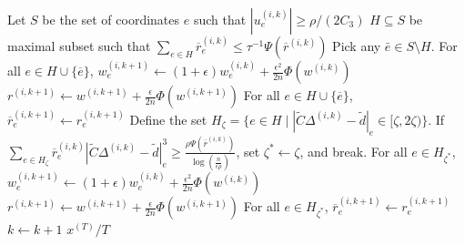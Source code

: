 \documentclass[11pt]{article}
\newcommand\dd{\boldsymbol{\mathit{d}}}
\newcommand\rr{\boldsymbol{\mathit{r}}}
\newcommand\uu{\boldsymbol{\mathit{u}}}
\newcommand\ww{\boldsymbol{\mathit{w}}}
\newcommand\xx{\boldsymbol{\mathit{x}}}
\newcommand\rrbar{\overline{\boldsymbol{\mathit{r}}}}
\newcommand\CC{\boldsymbol{\mathit{C}}}
\newcommand{\wt}{\widetilde}
\newcommand{\ov}{\overline}
\begin{document}
\begin{algorithm}
\begin{algorithmic}[1]
\State Let $S$ be the set of coordinates $e$ such that $|\uu^{(i,k)}_e|\geq \rho/(2C_3)$ \label{algline:setSRobust}
\State $H \subseteq S$ be maximal subset such that $\sum_{e\in H}\rrbar_e^{(i,k)}\leq \tau^{-1}\Psi(\rrbar^{(i,k)}) $
\State Pick any $\bar{e}\in S\setminus H$.
\State For all $e\in H \cup \{\ov{e}\} $, $\ww_e^{(i,k+1)}\gets (1+\epsilon)\ww_e^{(i,k)} + \frac{\epsilon^2}{2n}\Phi(\ww^{(i,k)})$ 
\State $\rr^{(i,k+1)}\gets \ww^{(i,k+1)} + \frac{\epsilon}{2n}\Phi(\ww^{(i,k+1)})$
\State For all $e\in H \cup \{\ov{e}\} $, $\ov{\rr}_e^{(i,k+1)} \gets \rr_e^{(i,k+1)}$ 
\Else
{}
\State {}
\State Define the set $H_\zeta = \{e \in H \mid |\wt{\CC} \Delta^{(i,k)} - \wt{\dd}|_e \in [\zeta, 2 \zeta)\}$.
\State If $\sum_{e \in H_{\zeta}} \ov{\rr}^{(i,k)}_e |\wt{\CC} \Delta^{(i,k)} - \wt{\dd}|_e^3 \geq \frac{\rho \Psi(\ov{\rr}^{(i,k)})}{\log (\frac{n}{\epsilon \rho})}$, set $\zeta^* \gets \zeta$, and break. 
\EndFor
\State For all $e \in H_{\zeta^*}$, $\ww_e^{(i,k+1)}\gets (1+\epsilon)\ww_e^{(i,k)} + \frac{\epsilon^2}{2n}\Phi(\ww^{(i,k)})$
\State $\rr^{(i,k+1)}\gets \ww^{(i,k+1)} + \frac{\epsilon}{2n}\Phi(\ww^{(i,k+1)})$
\State For all $e\in H_{\zeta^*}$, $\ov{\rr}_e^{(i,k+1)} \gets \rr_e^{(i,k+1)}$ 
\EndIf
\State $k \gets k+1$
\EndIf
\EndWhile
\State \Return $\xx^{(T)}/T$
\EndProcedure
\end{algorithmic}
\end{algorithm}
\end{document}
